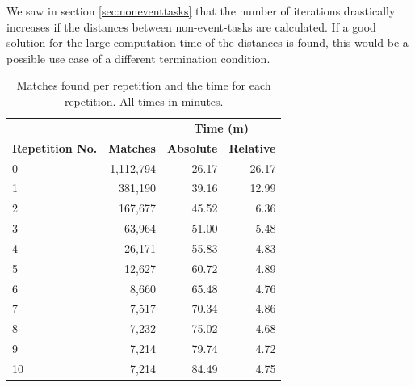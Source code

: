 We saw in section \ref{sec:noneventtasks} that the number of iterations drastically increases if the distances between non-event-tasks are calculated.
If a good solution for the large computation time of the distances is found, this would be a possible use case of a different termination condition.

\begin{table}[h!]
		\centering
	\begin{tabular}{ l r r r }
		  \toprule
			& & \multicolumn{2}{c}{\textbf{Time (m)}} \\
			\cmidrule{3-4}
		  \textbf{Repetition No.} & \textbf{Matches} & \textbf{Absolute}& \textbf{Relative} \\
		  \midrule
     		 0  & 1,112,794 & 26.17 & 26.17\\
	       1  & 381,190   & 39.16 & 12.99\\
		    2  & 167,677   & 45.52 & 6.36\\
		    3  & 63,964    & 51.00 & 5.48\\
		    4  & 26,171    & 55.83 & 4.83\\
		    5  & 12,627    & 60.72 & 4.89\\
		    6  & 8,660     & 65.48 & 4.76\\
		    7  & 7,517     & 70.34 & 4.86\\
		    8  & 7,232     & 75.02 & 4.68\\
		    9  & 7,214     & 79.74 & 4.72\\
		    10 & 7,214     & 84.49 & 4.75\\
		  \bottomrule
		   \end{tabular}
		   \caption{Matches found per repetition and the time for each repetition. All times in minutes.}
		   \label{tab:timesandmatchesperiteration} %
	\end{table}
%

